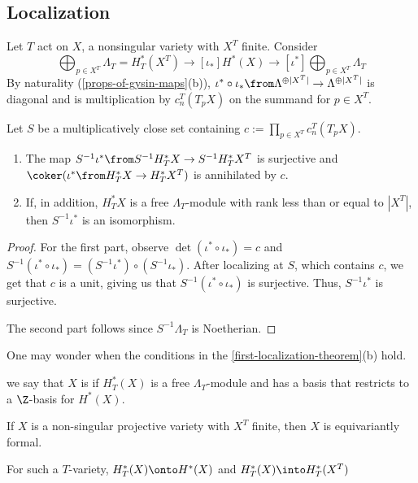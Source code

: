 \documentclass[11pt,leqno,oneside]{amsbook}
\numberwithin{thm}{section}
\begin{document}
\subsection{Localization}
Let \(T\) act on \(X\), a nonsingular variety with \(X^T\)
finite. Consider \[
  \bigoplus_{p \in X^T} \Lambda_T = H_T^* (X^T) \to[\iota_*] H^*(X)
  \to[\iota^*] \bigoplus_{p \in X^T} \Lambda_T
\]
By naturality (\ref{props-of-gysin-maps}(b)), \(\iota^* \circ
\iota_*\from \Lambda^{\oplus |X^T|} \to \Lambda^{\oplus |X^T|}\) is
diagonal and is multiplication by \(c_n^T(T_p X)\) on the summand for
\(p \in X^T\).
\begin{thm}\label{first-localization-theorem}
  Let \(S\) be a multiplicatively close set containing \(c := \prod_{p
    \in X^T} c_n^T(T_p X)\).
  \begin{enumerate}
  \item The map \(S^{-1}\iota^* \from S^{-1} H_T^* X \to S^{-1} H_T^*
    X^T\) is surjective and \(\coker(\iota^* \from H_T^* X \to H_T^*
    X^T)\) is annihilated by \(c\).
  \item If, in addition, \(H_T^* X\) is a free \(\Lambda_T\)-module
    with rank less than or equal to \(|X^T|\), then \(S^{-1} \iota^*\)
    is an isomorphism. 
  \end{enumerate}
\end{thm}
\begin{proof}
  For the first part, observe \(\det(\iota^* \circ \iota_*) = c\) and
  \(S^{-1}(\iota^* \circ \iota_*) = (S^{-1} \iota^*) \circ (S^{-1}
  \iota_*)\). After localizing at \(S\), which contains \(c\), we get
  that \(c\) is a unit, giving us that \(S^{-1}(\iota^* \circ
  \iota_*)\) is surjective. Thus, \(S^{-1} \iota^*\) is surjective.

  The second part follows since \(S^{-1} \Lambda_T\) is Noetherian. 
\end{proof}
One may wonder when the conditions in the
\ref{first-localization-theorem}(b) hold.
\begin{defn}
  we say that \(X\) is  if \(H_T^*(X)\) is a
  free \(\Lambda_T\)-module and has a basis that restricts to a
  \(\Z\)-basis for \(H^*(X)\).
\end{defn}
\begin{prop}
  If \(X\) is a non-singular projective variety with \(X^T\) finite,
  then \(X\) is equivariantly formal.
\end{prop}
\begin{cor}
  For such a \(T\)-variety, \(H_T^*(X) \onto H^*(X)\) and \(H_T^*(X)
  \into H_T^*(X^T)\)
\end{cor}
\end{document}
